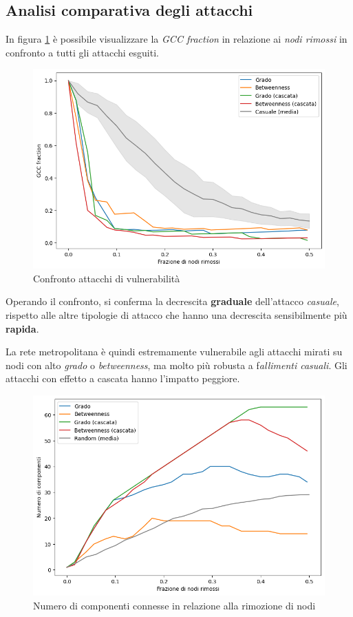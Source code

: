 \subsection{Analisi comparativa degli attacchi}
In figura \ref{fig: Confronto attacchi di vulnerabilità} è possibile visualizzare la \textit{GCC fraction} in relazione ai \textit{nodi rimossi} in confronto a tutti gli attacchi esguiti.

\vspace{1em}
\begin{figure}[h!]
    \centering
    \includegraphics[width=0.8\linewidth]{Immagini//Capitoli//cap5/atk_cfr.png}
    \caption{Confronto attacchi di vulnerabilità}
    \label{fig: Confronto attacchi di vulnerabilità}
\end{figure}
\vspace{1em}

Operando il confronto, si conferma la decrescita \textbf{graduale} dell'attacco \textit{casuale}, rispetto alle altre tipologie di attacco che hanno una decrescita sensibilmente più \textbf{rapida}.

La rete metropolitana è quindi estremamente vulnerabile agli attacchi mirati su nodi con alto \textit{grado} o \textit{betweenness}, ma molto più robusta a f\textit{allimenti casuali}. Gli attacchi con effetto a cascata hanno l’impatto peggiore.

\vspace{1em}
\begin{figure}[h!]
    \centering
    \includegraphics[width=0.8\linewidth]{Immagini//Capitoli//cap5/removed_cfr.png}
    \caption{Numero di componenti connesse in relazione alla rimozione di nodi}
    \label{fig: Numero di componenti connesse in relazione alla rimozione di nodi}
\end{figure}
\vspace{1em}

